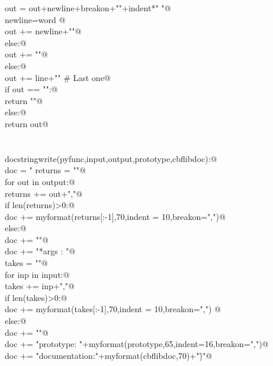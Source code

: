 \documentclass[10pt,a4paper,twoside,notitlepage]{article}
\begin{document}
\begin{flushleft}
\begin{list}{}{}
\mbox{}\verb@                  out = out+newline+breakon+"\n"+indent*" "@\\
\mbox{}\verb@                  newline=word       @\\
\mbox{}\verb@            out += newline+"\n"@\\
\mbox{}\verb@         else:@\\
\mbox{}\verb@            out += "\n"@\\
\mbox{}\verb@      else:@\\
\mbox{}\verb@         out += line+"\n" # Last one@\\
\mbox{}\verb@   if out == "":@\\
\mbox{}\verb@      return "\n"@\\
\mbox{}\verb@   else:@\\
\mbox{}\verb@      return out@\\
\mbox{}\verb@@\\
\mbox{}\verb@@\\
\mbox{}\verb@def docstringwrite(pyfunc,input,output,prototype,cbflibdoc):@\\
\mbox{}\verb@   doc = "%feature(\"autodoc\", \"\nReturns : "@\\
\mbox{}\verb@   returns = ""@\\
\mbox{}\verb@   for out in output:@\\
\mbox{}\verb@      returns += out+","@\\
\mbox{}\verb@   if len(returns)>0:@\\
\mbox{}\verb@      doc += myformat(returns[:-1],70,indent = 10,breakon=",")@\\
\mbox{}\verb@   else:@\\
\mbox{}\verb@      doc += "\n"@\\
\mbox{}\verb@   doc += "*args   : "@\\
\mbox{}\verb@   takes = ""@\\
\mbox{}\verb@   for inp in input:@\\
\mbox{}\verb@      takes += inp+","@\\
\mbox{}\verb@   if len(takes)>0:@\\
\mbox{}\verb@      doc += myformat(takes[:-1],70,indent = 10,breakon=",")   @\\
\mbox{}\verb@   else:@\\
\mbox{}\verb@      doc += "\n"@\\
\mbox{}\verb@   doc += "\nC prototype: "+myformat(prototype,65,indent=16,breakon=",")@\\
\mbox{}\verb@   doc += "\nCBFLib documentation:\n"+myformat(cbflibdoc,70)+"\")"@\\

\end{list}
\end{flushleft}
\end{document}
